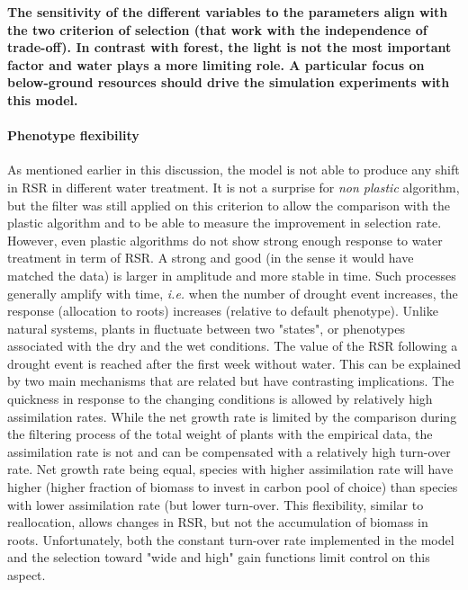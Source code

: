 
\textbf{The sensitivity of the different variables to the parameters align with the two criterion of selection (that work with the independence of trade-off). In contrast with forest, the light is not the most important factor and water plays a more limiting role. A particular focus on below-ground resources should drive the simulation experiments with this model.}


\paragraph{Phenotype flexibility}

As mentioned earlier in this discussion, the model is not able to produce any shift in RSR in different water treatment. It is not a surprise for \textit{non plastic} algorithm, but the filter was still applied on this criterion to allow the comparison with the plastic algorithm and to be able to measure the improvement in selection rate. However, even plastic algorithms do not show strong enough response to water treatment in term of RSR. A strong and good (in the sense it would have matched the data) is larger in amplitude and more stable in time. Such processes generally amplify with time, \textit{i.e.} when the number of drought event increases, the response (allocation to roots) increases (relative to default phenotype). Unlike natural systems, plants in \model fluctuate between two "states", or phenotypes associated with the dry and the wet conditions. The value of the RSR following a drought event is reached after the first week without water. This can be explained by two main mechanisms that are related but have contrasting implications. The quickness in response to the changing conditions is allowed by relatively high assimilation rates. While the net growth rate is limited by the comparison during the filtering process of the total weight of plants with the empirical data, the assimilation rate is not and can be compensated with a relatively high turn-over rate. Net growth rate being equal, species with higher assimilation rate will have higher  (higher fraction of biomass to invest in carbon pool of choice) than species with lower assimilation rate (but lower turn-over. This flexibility, similar to reallocation, allows changes in RSR, but not the accumulation of biomass in roots. Unfortunately, both the constant turn-over rate implemented in the model and the selection toward "wide and high" gain functions limit control on this aspect.

